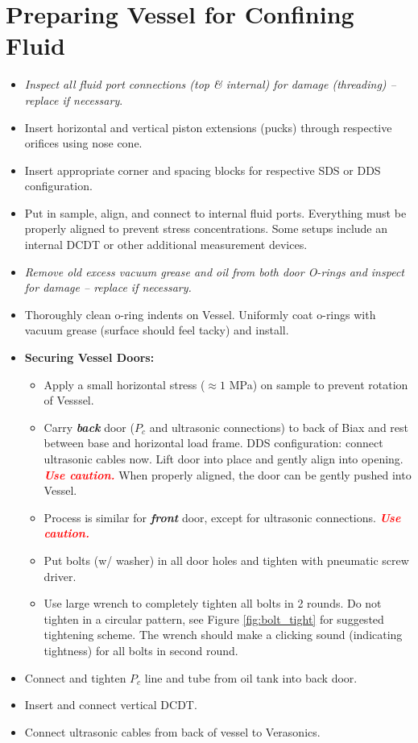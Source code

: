 \documentclass{article}
\newcommand{\caution}{
	\textbf{\textit{ \textcolor{red}{Use caution.} }}
}
\begin{document}
\section{Preparing Vessel for Confining Fluid}
\begin{itemize}
	\item \textit{Inspect all fluid port connections (top \& internal) for damage (threading) -- replace if necessary}.
	\item Insert horizontal and vertical piston extensions (pucks) through respective orifices using nose cone. 
	\item Insert appropriate corner and spacing blocks for respective SDS or DDS configuration. 
	\item Put in sample, align, and connect to internal fluid ports. Everything must be properly aligned to prevent stress concentrations. Some setups include an internal DCDT or other additional measurement devices.
	\item \textit{Remove old excess vacuum grease and oil from both door O-rings and inspect for damage -- replace if necessary. }
	\item Thoroughly clean o-ring indents on Vessel. Uniformly coat o-rings with vacuum grease (surface should feel tacky) and install. 
	\item \textbf{Securing Vessel Doors:}
	\begin{itemize}
		\item Apply a small horizontal stress ($\approx  1$ MPa) on sample to prevent rotation of Vesssel. 
		\item Carry \textbf{\textit{back}} door ($P_c$ and ultrasonic connections) to back of Biax and rest between base and horizontal load frame. DDS configuration: connect ultrasonic cables now. Lift door into place and gently align into opening.  \caution When properly aligned, the door can be gently pushed into Vessel.
		\item Process is similar for \textbf{\textit{front}} door, except for ultrasonic connections. \caution
		\item Put bolts (w/ washer) in all door holes and tighten with pneumatic screw driver.  
		\item Use large wrench to completely tighten all bolts in 2 rounds. Do not tighten in a circular pattern, see Figure \ref{fig:bolt_tight} for suggested tightening scheme.
	 The wrench should make a clicking sound (indicating tightness) for all bolts in second round. 
	\end{itemize}
	\item Connect and tighten $P_c$ line and tube from oil tank into back door. 
	\item Insert and connect vertical DCDT.
	\item Connect ultrasonic cables from back of vessel to Verasonics.
\end{itemize}
		
\end{document}
